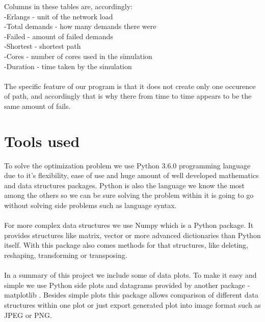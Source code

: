 \documentclass[conference]{IEEEtran}
\begin{document}
Columns in these tables are, accordingly: 
\\-Erlangs - unit of the network load
\\-Total demands - how many demands there were
\\-Failed - amount of failed demands
\\-Shortest - shortest path
\\-Cores - number of cores used in the simulation
\\-Duration - time taken by the simulation\\\\
The specific feature of our program is that it does not create only one occurence of path, and accordingly that is why there from time to time appears to be the same amount of fails. 

\section{Tools used}
To solve the optimization problem we use Python 3.6.0 \cite{python} programming language due to it's flexibility, ease of use and huge amount of well developed mathematics and data structures packages. Python is also the language we know the most among the others so we can be sure solving the problem within it is going to go without solving side problems such as language syntax.
\\ \\
For more complex data structures we use Numpy \cite{numpy} which is a Python package. It provides structures like matrix, vector or more advanced dictionaries than Python itself. With this package also comes methods for that structures, like deleting, reshaping, transforming or transposing.
\\ \\
In a summary of this project we include some of data plots. To make it easy and simple we use Python side plots and datagrams provided by another package - matplotlib \cite{matplotlib}. Besides simple plots this package allows comparison of different data structures within one plot or just export generated plot into image format such as JPEG or PNG.
\\
\end{document}
